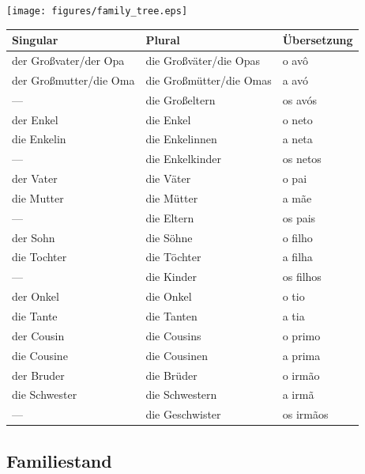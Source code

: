         \texttt{[image: figures/family\_tree.eps]}

        \begin{longtabu}to 
            \toprule
            \textbf{Singular} & \textbf{Plural} & \textbf{Übersetzung} \\ 
            \toprule \endhead
                der Großvater/der Opa & die Großväter/die Opas & o avô\\ \hline
                der Großmutter/die Oma & die Großmütter/die Omas & a avó\\ \hline
                --- & die Großeltern & os avós\\ \hline
                der Enkel & die Enkel & o neto\\ \hline
                die Enkelin & die Enkelinnen & a neta\\ \hline
                --- & die Enkelkinder & os netos\\ \hline
                der Vater & die Väter & o pai\\ \hline
                die Mutter & die Mütter & a mãe\\ \hline
                --- & die Eltern & os pais\\ \hline
                der Sohn & die Söhne & o filho\\ \hline
                die Tochter & die Töchter & a filha\\ \hline
                --- & die Kinder & os filhos\\ \hline
                der Onkel & die Onkel & o tio\\ \hline
                die Tante & die Tanten & a tia\\ \hline
                der Cousin & die Cousins & o primo\\ \hline
                die Cousine & die Cousinen & a prima\\ \hline
                der Bruder & die Brüder & o irmão\\ \hline
                die Schwester & die Schwestern & a irmã\\ \hline
                --- & die Geschwister & os irmãos\\ \hline
            \toprule
        \end{longtabu}

        \subsection{Familiestand}\label{subsection:deutsch:familie:familiestand}

